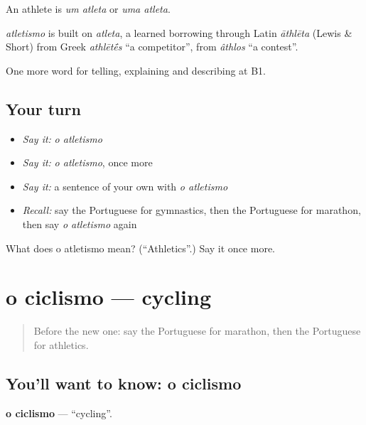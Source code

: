 An athlete is \emph{um atleta} or \emph{uma atleta}.

\begin{cousinweb}
\emph{atletismo} is built on \emph{atleta}, a learned borrowing through Latin \emph{āthlēta} (Lewis \& Short) from Greek \emph{athlēt\'{\={e}}s} \textquotedblleft{}a competitor\textquotedblright{}, from \emph{âthlos} \textquotedblleft{}a contest\textquotedblright{}.
\end{cousinweb}

\begin{grammarlens}[title={What you've built}]
One more word for telling, explaining and describing at B1.
\end{grammarlens}

\subsection*{Your turn}
\begin{itemize}
\raggedright
  \item \emph{Say it:} \emph{o atletismo}
  \item \emph{Say it:} \emph{o atletismo}, once more
  \item \emph{Say it:} a sentence of your own with \emph{o atletismo}
  \item \emph{Recall:} say the Portuguese for gymnastics, then the Portuguese for marathon, then say \emph{o atletismo} again
\end{itemize}

\begin{tcolorbox}[breakable,colback=teal!4,colframe=teal!35!black,title={Before you move on}]
What does o atletismo mean? (\textquotedblleft{}Athletics\textquotedblright{}.) Say it once more.
\end{tcolorbox}
\section[o ciclismo]{o ciclismo — cycling}

\label{lesson:PT-C513-ciclismo}



\begin{quote}
Before the new one: say the Portuguese for marathon, then the Portuguese for athletics.
\end{quote}

\subsection*{You'll want to know: o ciclismo}
\textbf{o ciclismo} — \textquotedblleft{}cycling\textquotedblright{}.


